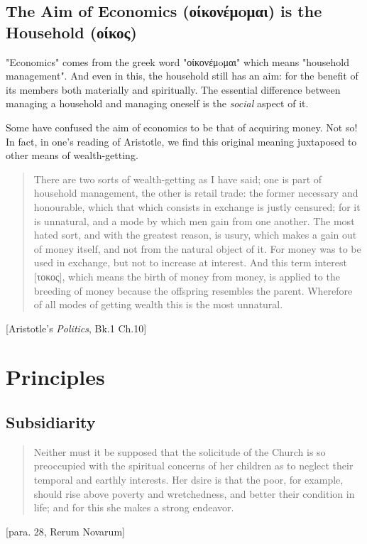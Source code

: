 \documentclass[letterpaper]{article}
\begin{document}
\subsection{The Aim of Economics (οίκονέμoμαι) is the Household (οίκος)}

"Economics" comes from the greek word "οίκονέμoμαι" which means "household management". And even in this, the household still has an aim: for the benefit of its members both materially and spiritually. The essential difference between managing a household and managing oneself is the \textit{social} aspect of it.

Some have confused the aim of economics to be that of acquiring money. Not so! In fact, in one's reading of Aristotle, we find this original meaning juxtaposed to other means of wealth-getting.

\begin{quote}
  There are two sorts of wealth-getting as I have said; one is part of household management, the other is retail trade: the former necessary and honourable, which that which consists in exchange is justly censured; for it is unnatural, and a mode by which men gain from one another. The most hated sort, and with the greatest reason, is usury, which makes a gain out of money itself, and not from the natural object of it. For money was to be used in exchange, but not to increase at interest. And this term interest [τοκος], which means the birth of money from money, is applied to the breeding of money because the offspring resembles the parent. Wherefore of all modes of getting wealth this is the most unnatural.
\end{quote} [Aristotle's \textit{Politics}, Bk.1 Ch.10]

\section{Principles}

\subsection{Subsidiarity}

\begin{quote}
  Neither must it be supposed that the solicitude of the Church is so preoccupied with the spiritual concerns of her children as to neglect their temporal and earthly interests. Her dsire is that the poor, for example, should rise above poverty and wretchedness, and better their condition in life; and for this she makes a strong endeavor.
\end{quote} [para. 28, Rerum Novarum]
\end{document}
